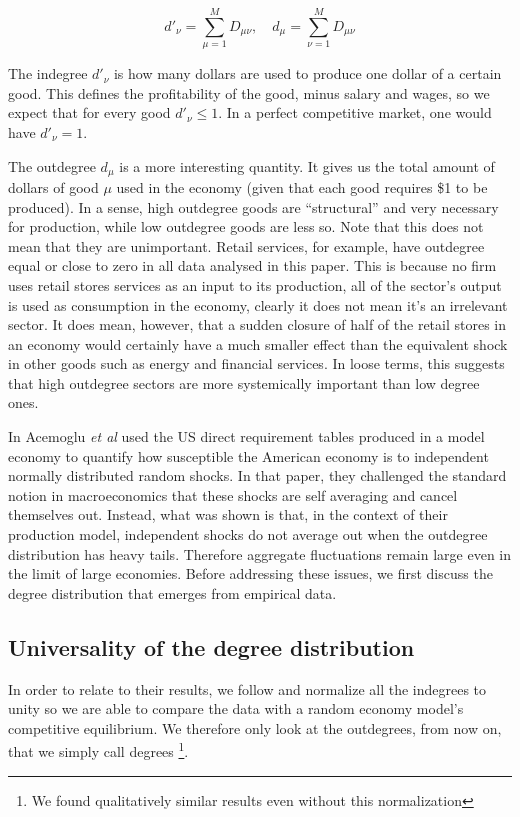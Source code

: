 \begin{equation}
  \label{eq:1}
 d'_\nu = \sum_{\mu=1}^M D_{\mu\nu},  \quad  d_\mu = \sum_{\nu = 1}^M D_{\mu\nu}
\end{equation}

The indegree $d'_\nu$ is how many dollars are used to produce one
dollar of a certain good. This defines the profitability of the good,
minus salary and wages, so we expect that for every good $d'_\nu \leq
1$. In a perfect competitive market, one would have $d'_\nu = 1$.

The outdegree $d_\mu$ is a more interesting quantity. It gives us the
total amount of dollars of good $\mu$ used in the economy (given that
each good requires \$1 to be produced). In a sense, high outdegree
goods are ``structural'' and very necessary for production, while low
outdegree goods are less so. Note that this does not mean that they
are unimportant. Retail services, for example, have outdegree equal or
close to zero in all data analysed in this paper. This is because no firm
uses retail stores services as an input to its production, all of
the sector's output is used as consumption in the
economy, clearly it does not mean it's an irrelevant sector. It does
mean, however, that a sudden closure of half of the retail stores in
an economy would certainly have a much smaller effect than the
equivalent shock in other goods such as energy and financial
services. In loose terms, this suggests that high outdegree sectors
are more systemically important than low degree ones.

In \cite{Acemoglu12} Acemoglu \emph{et al} used the US direct requirement
tables produced in a model economy to quantify how susceptible the American
economy is to independent normally distributed random shocks. In that paper, they challenged the standard notion in macroeconomics that these shocks are self averaging and cancel themselves out. Instead, what was shown is that, in the context of their production model,
independent shocks do not average out when the outdegree distribution
has heavy tails. Therefore aggregate fluctuations remain large even in
the limit of large economies. Before addressing these issues, we
 first discuss the degree distribution that emerges from
empirical data.

\subsection{Universality of the degree distribution}

In order to relate to their results, we follow \cite{Acemoglu12} and
normalize all the indegrees to unity so we are able to compare the
data with a random economy model's competitive equilibrium. We
therefore only look at the outdegrees, from now on, that we simply call
degrees \footnote{We found qualitatively similar results even
  without this normalization}.

